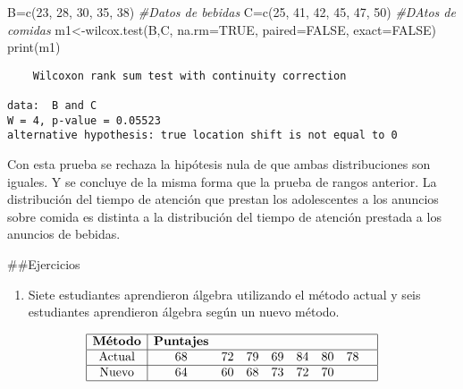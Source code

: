\documentclass[
  a4paper,
  oneside,
  openany]{book}
\newenvironment{Shaded}{\begin{snugshade}}{\end{snugshade}}
\newcommand{\AttributeTok}[1]{\textcolor[rgb]{0.77,0.63,0.00}{#1}}
\newcommand{\CommentTok}[1]{\textcolor[rgb]{0.56,0.35,0.01}{\textit{#1}}}
\newcommand{\ConstantTok}[1]{\textcolor[rgb]{0.00,0.00,0.00}{#1}}
\newcommand{\DecValTok}[1]{\textcolor[rgb]{0.00,0.00,0.81}{#1}}
\newcommand{\FunctionTok}[1]{\textcolor[rgb]{0.00,0.00,0.00}{#1}}
\newcommand{\NormalTok}[1]{#1}
\newcommand{\OtherTok}[1]{\textcolor[rgb]{0.56,0.35,0.01}{#1}}
\providecommand{\tightlist}{%
  \setlength{\itemsep}{0pt}\setlength{\parskip}{0pt}}
\begin{document}
\begin{Shaded}
\begin{Highlighting}[]
\NormalTok{B}\OtherTok{=}\FunctionTok{c}\NormalTok{(}\DecValTok{23}\NormalTok{, }\DecValTok{28}\NormalTok{, }\DecValTok{30}\NormalTok{, }\DecValTok{35}\NormalTok{, }\DecValTok{38}\NormalTok{)     }\CommentTok{\#Datos de bebidas}
\NormalTok{C}\OtherTok{=}\FunctionTok{c}\NormalTok{(}\DecValTok{25}\NormalTok{, }\DecValTok{41}\NormalTok{, }\DecValTok{42}\NormalTok{, }\DecValTok{45}\NormalTok{, }\DecValTok{47}\NormalTok{, }\DecValTok{50}\NormalTok{) }\CommentTok{\#DAtos de comidas}
\NormalTok{m1}\OtherTok{\textless{}{-}}\FunctionTok{wilcox.test}\NormalTok{(B,C, }\AttributeTok{na.rm=}\ConstantTok{TRUE}\NormalTok{, }\AttributeTok{paired=}\ConstantTok{FALSE}\NormalTok{, }\AttributeTok{exact=}\ConstantTok{FALSE}\NormalTok{)}
\FunctionTok{print}\NormalTok{(m1)}
\end{Highlighting}
\end{Shaded}

\begin{verbatim}
    Wilcoxon rank sum test with continuity correction

data:  B and C
W = 4, p-value = 0.05523
alternative hypothesis: true location shift is not equal to 0
\end{verbatim}

Con esta prueba se rechaza la hipótesis nula de que ambas distribuciones son iguales. Y se concluye de la misma forma que la prueba de rangos anterior. La distribución del tiempo de atención que prestan los adolescentes a los anuncios sobre comida es distinta a la distribución del tiempo de atención prestada a los anuncios de bebidas.

\#\#Ejercicios

\begin{enumerate}
\def\labelenumi{\arabic{enumi}.}
\tightlist
\item
  Siete estudiantes aprendieron álgebra utilizando el método actual y seis estudiantes aprendieron álgebra según un nuevo método.
\end{enumerate}

\[
\begin{array}{|c| c c c c c c c c|} 
\hline 
\textbf{Método} &\textbf{Puntajes} &&&&& & & \\ 
 \hline
\mbox{Actual} & 68 & 72 & 79 & 69 & 84 & 80 & 78 &\\ 
 \hline
\mbox{Nuevo} & 64 & 60 & 68 & 73 & 72 & 70& & \\ 
\hline
\end{array}
\]
\end{document}
